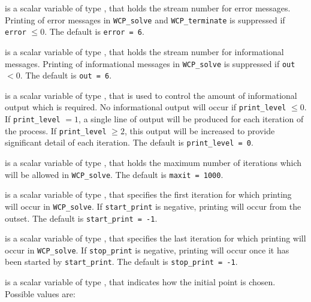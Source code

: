 \documentclass{galahad}
\newcommand{\packagename}{WCP}
\begin{document}
\begin{description}

 is a scalar variable of type \integer, that holds the
stream number for error messages. Printing of error messages in 
{\tt \packagename\_solve} and {\tt \packagename\_terminate} is suppressed if 
{\tt error} $\leq 0$.
The default is {\tt error = 6}.

 is a scalar variable of type \integer, that holds the
stream number for informational messages. Printing of informational messages in 
{\tt \packagename\_solve} is suppressed if {\tt out} $< 0$.
The default is {\tt out = 6}.

 is a scalar variable of type \integer, that is used
to control the amount of informational output which is required. No 
informational output will occur if {\tt print\_level} $\leq 0$. If 
{\tt print\_level} $= 1$, a single line of output will be produced for each
iteration of the process. If {\tt print\_level} $\geq 2$, this output will be
increased to provide significant detail of each iteration.
The default is {\tt print\_level = 0}.

 is a scalar variable of type \integer, that holds the
maximum number of iterations which will be allowed in {\tt \packagename\_solve}.
The default is {\tt maxit = 1000}.

 is a scalar variable of type \integer, that specifies
the first iteration for which printing will occur in {\tt \packagename\_solve}.
If {\tt start\_print} is negative, printing will occur from the outset.
The default is {\tt start\_print = -1}.

 is a scalar variable of type \integer, that specifies
the last iteration for which printing will occur in  {\tt \packagename\_solve}.
If {\tt stop\_print} is negative, printing will occur once it has been 
started by {\tt start\_print}.
The default is {\tt stop\_print = -1}.

 is a scalar variable of type \integer, 
that indicates how the initial point is chosen.
Possible values are:


\end{description}
\end{document}
